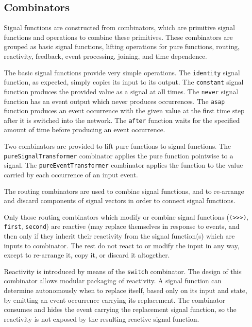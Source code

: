 \subsection{Combinators}
\label{section:System_Design_and_Interface-Combinators}

Signal functions are constructed from combinators, which are primitive signal
functions and operations to combine these primitives. These combinators are
grouped as basic signal functions, lifting operations for pure functions,
routing, reactivity, feedback, event processing, joining, and time dependence.

The basic signal functions
provide very simple operations. The {\tt identity} signal function, as expected,
simply copies its input to its output. The {\tt constant} signal function
produces the provided value as a signal at all times. The {\tt never} signal
function has an event output which never produces occurrences. The {\tt asap}
function produces an event occurrence with the given value at the first time
step after it is switched into the network. The {\tt after} function waits for
the specified amount of time before producing an event occurrence.

Two combinators are provided to lift pure functions to signal functions.
The {\tt pureSignalTransformer} combinator applies the pure function pointwise
to a signal. The {\tt pureEventTransformer} combinator applies the function to
the value carried by each occurrence of an input event.

The routing combinators are used to combine signal functions, and to re-arrange
and discard components of signal vectors in order to connect signal functions.

Only those routing combinators which modify or combine signal functions
({\tt (>>>)}, {\tt first}, {\tt second}) are reactive (may replace themselves in
response to events, and then only if they inherit their reactivity from the
signal function(s) which are inputs to combinator. The rest do not
react to or modify the input in any way, except to re-arrange it, copy it, or
discard it altogether.

Reactivity is introduced by means of the {\tt switch} combinator.
The design of this combinator
allows modular packaging of reactivity. A signal function can determine
autonomously when to replace itself, based only on its input and state,
by emitting an event occurrence carrying its replacement. The combinator
consumes and hides the event carrying the replacement signal function, 
so the reactivity is not exposed by the resulting reactive signal function.

